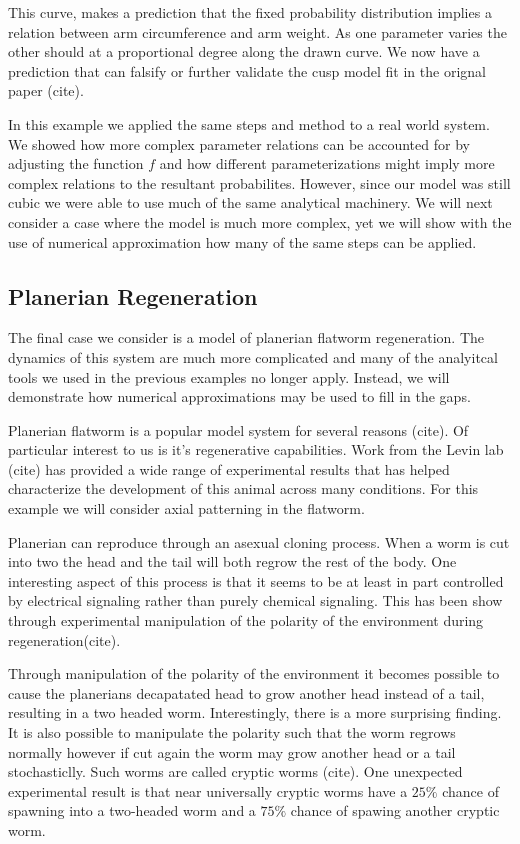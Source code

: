\documentclass[letterpaper]{article}
\begin{document}
This curve, makes a prediction that the fixed probability 
distribution implies a
relation between arm circumference and arm weight. As one parameter varies 
the other should at a proportional degree along the drawn curve.
We now have a prediction that can falsify or 
further validate the cusp model fit in the 
orignal paper (cite).

In this example we applied the same steps and method to a real world system. 
We showed how
more complex parameter relations can be accounted for by adjusting the 
function $f$ and how
different parameterizations might imply more complex relations to the 
resultant probabilites.
However, since our model was still cubic we were able to use much of 
the same analytical 
machinery. We will next consider a case where the model is much more 
complex, yet we will 
show with the use of numerical approximation how many of the same 
steps can be applied.

\subsection{Planerian Regeneration}

The final case we consider is a model of planerian flatworm regeneration. The dynamics 
of this system are much more complicated and many of the analyitcal tools we used
in the previous examples no longer apply. Instead, we will demonstrate how numerical
approximations may be used to fill in the gaps.

Planerian flatworm is a popular model system for several reasons (cite). Of particular
interest to us is it's regenerative capabilities. Work from the Levin lab (cite) has
provided a wide range of experimental results that has helped characterize the development
of this animal across many conditions. For this example we will consider axial patterning
in the flatworm.

Planerian can reproduce through an asexual cloning process. When a worm is cut into two
the head and the tail will both regrow the rest of the body. One interesting aspect of
this process is that it seems to be at least in part controlled by electrical signaling
rather than purely chemical signaling. This has been show through experimental manipulation
of the polarity of the environment during regeneration(cite).

Through manipulation of the polarity of the environment it becomes possible to cause
the planerians decapatated head to grow another head instead of a tail, resulting
in a two headed worm. Interestingly, there is a more surprising finding. It is also
possible to manipulate the polarity such that the worm regrows normally however if 
cut again the worm may grow another head or a tail stochasticlly. Such worms are 
called cryptic worms (cite). One unexpected experimental result is that near universally
cryptic worms have a $25\%$ chance of spawning into a two-headed worm and a 
$75\%$ chance 
of spawing another cryptic worm.
\end{document}
